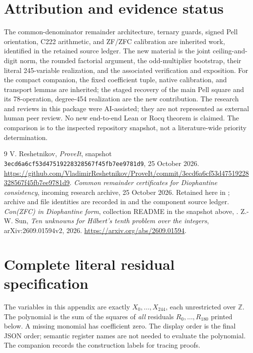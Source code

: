 \documentclass[11pt,letterpaper]{article}
\theoremstyle{remark}\newtheorem{remark}[theorem]{Remark}
\newcommand{\Z}{\mathbb Z}\newcommand{\N}{\mathbb N}
\begin{document}
\section*{Attribution and evidence status}
The common-denominator remainder architecture, ternary guards, signed Pell
orientation, C222 arithmetic, and ZF/ZFC calibration are inherited work,
identified in the retained source ledger. The new material is the joint
ceiling-and-digit norm, the rounded factorial argument, the odd-multiplier
bootstrap, their literal 245-variable realization, and the associated
verification and exposition. For the compact companion, the fixed coefficient
tuple, native calibration, and transport lemmas are inherited; the staged
recovery of the main Pell square and its 78-operation, degree-454 realization
are the new contribution. The research and reviews in this package were
AI-assisted; they are not represented as external human peer review.
No new end-to-end Lean or Rocq theorem is claimed. The comparison is to the
inspected repository snapshot, not a literature-wide priority determination.

\begin{thebibliography}{9}
 V. Reshetnikov, \emph{ProveIt}, snapshot
\texttt{3ecd6a6cf53d47519228328567f45fb7ee9781d9}, 25 October 2026.
\url{https://github.com/VladimirReshetnikov/ProveIt/commit/3ecd6a6cf53d47519228328567f45fb7ee9781d9}.
 \emph{Common remainder certificates for Diophantine
consistency}, incoming research archive, 25 October 2026. Retained here in
; archive and file identities are
recorded in  and the component source ledger.
 \emph{Con(ZFC) in Diophantine form}, collection README in
the snapshot above, .
 Z.-W. Sun, \emph{Ten unknowns for Hilbert's tenth problem
over the integers}, arXiv:2609.01594v2, 2026.
\url{https://arxiv.org/abs/2609.01594}.
\end{thebibliography}

\appendix
\clearpage
\section{Complete literal residual specification}\label{app:residuals}
The variables in this appendix are exactly \(X_0,\ldots,X_{244}\), each
unrestricted over \(\Z\). The polynomial is the sum of the squares of
\emph{all} residuals \(R_0,\ldots,R_{180}\) printed below. A missing monomial
has coefficient zero. The display order is the final JSON order; semantic
register names are not needed to evaluate the polynomial. The companion
 records the construction labels for tracing proofs.

\end{document}
